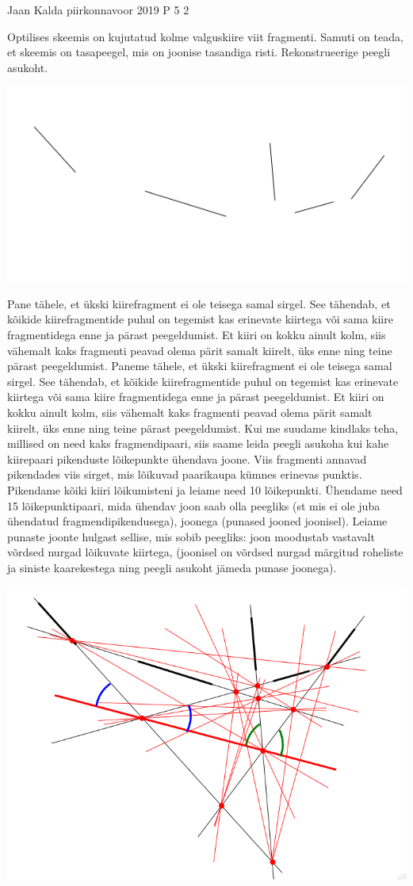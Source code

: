 {Jaan Kalda} %
{piirkonnavoor} %
{2019} %
{P 5} %
{2} %
{
\ifStatement
Optilises skeemis on kujutatud kolme valguskiire viit fragmenti. Samuti on teada, et skeemis on tasapeegel, mis on joonise tasandiga risti. Rekonstrueerige peegli asukoht. 
\begin{center}
	\includegraphics[width=0.5\linewidth]{2019-v2p-05-yl.PNG}
\end{center}
\fi
\ifHint
Pane tähele, et ükski kiirefragment ei ole teisega samal sirgel. See tähendab, et kõikide kiirefragmentide puhul on tegemist kas erinevate kiirtega või sama kiire fragmentidega enne ja pärast peegeldumist. Et kiiri on kokku ainult kolm, siis vähemalt kaks fragmenti peavad olema pärit samalt kiirelt, üks enne ning teine pärast peegeldumist. 
\fi
\ifSolution
Paneme tähele, et ükski kiirefragment ei ole teisega samal sirgel. See tähendab, et kõikide kiirefragmentide puhul on tegemist kas erinevate kiirtega või sama kiire fragmentidega enne ja pärast peegeldumist. Et kiiri on kokku ainult kolm, siis vähemalt kaks fragmenti peavad olema pärit samalt kiirelt, üks enne ning teine pärast peegeldumist. Kui me suudame kindlaks teha, millised on need kaks fragmendipaari, siis saame leida peegli asukoha kui kahe kiirepaari pikenduste lõikepunkte ühendava joone. Viis fragmenti annavad pikendades viis sirget, mis lõikuvad paarikaupa kümnes erinevas punktis. Pikendame kõiki kiiri lõikumisteni ja leiame need 10 lõikepunkti. Ühendame need 15 lõikepunktipaari, mida ühendav joon saab olla peegliks (st mis ei ole juba ühendatud fragmendipikendusega), joonega (punased jooned joonisel). Leiame punaste joonte hulgast sellise, mis sobib peegliks: joon moodustab vastavalt võrdsed nurgad lõikuvate kiirtega, (joonisel on võrdsed nurgad märgitud roheliste ja siniste kaarekestega ning peegli asukoht jämeda punase joonega).
\begin{center}
	\includegraphics[width=0.5\linewidth]{2019-v2p-05-lah.PNG}
\end{center}
\fi
}
